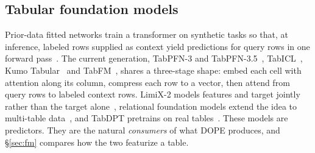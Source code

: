 \documentclass[10pt,letterpaper,twocolumn]{article}
\begin{document}
\subsection{Tabular foundation models}
Prior-data fitted networks train a transformer on synthetic tasks so that, at inference, labeled rows supplied as context yield predictions for query rows in one forward pass~\cite{muller2022pfn,hollmann2023tabpfn,hollmann2025nature}. The current generation, TabPFN-3 and TabPFN-3.5~\cite{tabpfn3,tabpfn35}, TabICL~\cite{tabicl}, Kumo Tabular~\cite{kumotabular} and TabFM~\cite{tabfm}, shares a three-stage shape: embed each cell with attention along its column, compress each row to a vector, then attend from query rows to labeled context rows. LimiX-2 models features and target jointly rather than the target alone~\cite{limix2}, relational foundation models extend the idea to multi-table data~\cite{kumorfm,kumorfm2}, and TabDPT pretrains on real tables~\cite{tabdpt}. These models are predictors. They are the natural \emph{consumers} of what DOPE produces, and \S\ref{sec:fm} compares how the two featurize a table.
\end{document}
